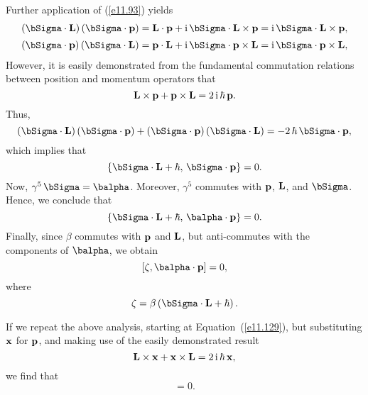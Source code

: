 Further application of (\ref{e11.93}) yields
\begin{align}\label{e11.129}
(\bSigma\cdot {\bf L})\,(\bSigma\cdot{\bf p}) &= {\bf L}\cdot {\bf p} + {\rm i}\,\bSigma\cdot{\bf L}\times {\bf p}= {\rm i}\,\bSigma\cdot{\bf L}\times{\bf p},\\[0.5ex]
(\bSigma\cdot {\bf p})\,(\bSigma\cdot{\bf L}) &= {\bf p}\cdot {\bf L} + {\rm i}\,\bSigma\cdot{\bf p}\times {\bf L}= {\rm i}\,\bSigma\cdot{\bf p}\times{\bf L},
\end{align}
However, it is easily demonstrated from the fundamental commutation relations between position and momentum operators that
\begin{equation}
{\bf L}\times {\bf p} + {\bf p}\times{\bf L} = 2\,{\rm i}\,\hbar\,{\bf p}.
\end{equation}
Thus,
\begin{equation}
(\bSigma\cdot{\bf L})\,(\bSigma\cdot{\bf p}) + (\bSigma\cdot{\bf p})\,(\bSigma\cdot{\bf L}) =-2\,\hbar\,\bSigma\cdot{\bf p},
\end{equation}
which implies that
\begin{equation}
\{\bSigma\cdot {\bf L}+ \hbar,\, \bSigma\cdot {\bf p}\} = 0.
\end{equation}
Now, $\gamma^5\,\bSigma = \balpha$. Moreover, $\gamma^5$ commutes with ${\bf p}$, ${\bf L}$, and $\bSigma$. Hence,
we conclude that
\begin{equation}
\{\bSigma\cdot {\bf L}+ \hbar,\, \balpha\cdot {\bf p}\} = 0.
\end{equation}
Finally, since $\beta$ commutes with ${\bf p}$ and ${\bf L}$, but anti-commutes with the components of $\balpha$, we obtain
\begin{equation}\label{e11.135}
[\zeta,\balpha\cdot {\bf p}] = 0,
\end{equation}
where 
\begin{equation}\label{e11.137}
\zeta = \beta\left(\bSigma\cdot{\bf L} + \hbar\right).
\end{equation}

If we repeat the above analysis, starting at Equation~(\ref{e11.129}), but substituting ${\bf x}$ for ${\bf p}$, and 
making use of the easily demonstrated result
\begin{equation}
{\bf L}\times {\bf x} + {\bf x}\times{\bf L} = 2\,{\rm i}\,\hbar\,{\bf x},
\end{equation}
we find that
\begin{equation}
[\zeta,\balpha\cdot {\bf x}] = 0.
\end{equation}

